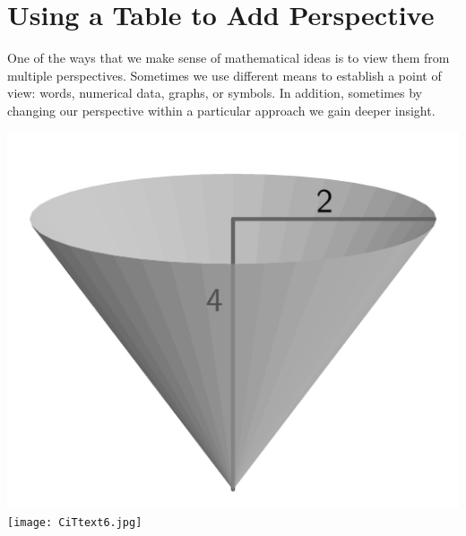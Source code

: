 \documentclass{ximera}
\begin{document}

\section{Using a Table to Add Perspective}

One of the ways that we make sense of mathematical ideas is to view them from multiple perspectives.  Sometimes we use different means to establish a point of view:  words, numerical data, graphs, or symbols.  In addition, sometimes by changing our perspective within a particular approach we gain deeper insight.%

\begin{image}
\includegraphics[width=.7\textwidth]{tandem-empty-conical-tank.jpg}
\texttt{[image: CiTtext6.jpg]}
\end{image}
\end{document}
